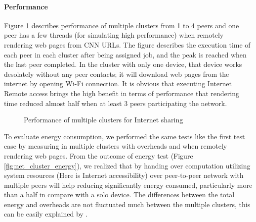 \documentclass[conference]{IEEEtran}
\begin{document}
\paragraph{Performance}
Figure \ref{fig:net_clusters_perf} describes performance of multiple clusters from 1 to 4 peers and one peer has a few threads (for simulating high performance) when remotely rendering web pages from CNN URLs. The figure describes the execution time of each peer in each cluster after being assigned job, and the peak is reached when the last peer completed. In the cluster with only one device, that device works desolately without any peer contacts; it will download web pages from the internet by opening Wi-Fi connection. It is obvious that executing Internet Remote access brings the high benefit in terms of performance that rendering time reduced almost half when at least 3 peers participating the network. 

\begin{figure}[H]
	\hspace*{0cm}
	\caption{Performance of multiple clusters for Internet sharing}
	\label{fig:net_clusters_perf}
\end{figure}

To evaluate energy consumption, we performed the same tests like the first test case by measuring in multiple clusters with overheads and when remotely rendering web pages. From the outcome of energy test (Figure \ref{fig:net_cluster_energy}), we realized that by handing over computation utilizing system resources (Here is Internet accessibility) over peer-to-peer network with multiple peers will help reducing significantly energy consumed, particularly more than a half in compare with a solo device. The differences between the total energy and overheads are not fluctuated much between the multiple clusters, this can be easily explained by \cite{wifi_energy}.
\end{document}
